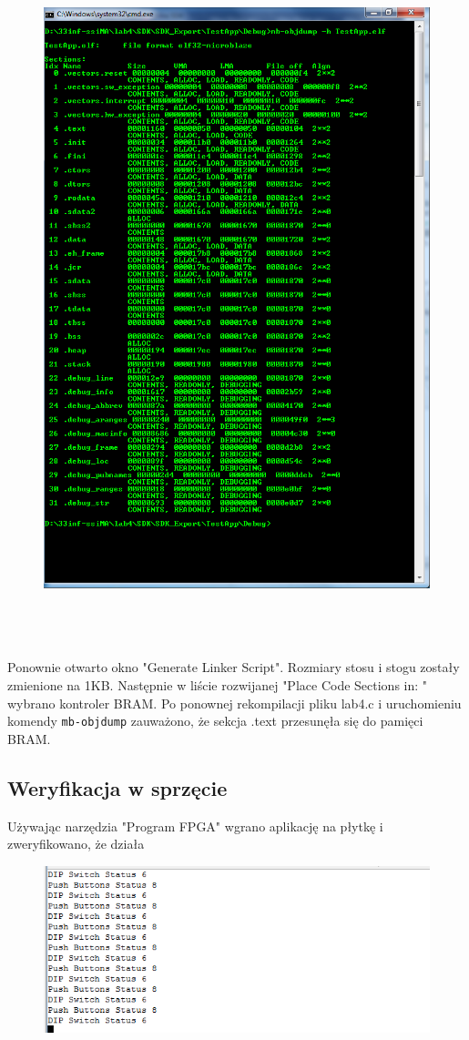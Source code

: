 \begin{figure}[h]
	\centering
	\includegraphics[height=20cm]{img/objdump.PNG}
	\label{img:objdump}
\end{figure}

Ponownie otwarto okno "Generate Linker Script". Rozmiary stosu i stogu zostały zmienione na 1KB. Następnie w liście rozwijanej "Place Code Sections in: " wybrano kontroler BRAM.
\newpage
Po ponownej rekompilacji pliku lab4.c i uruchomieniu komendy \verb+mb-objdump+ zauważono, że sekcja .text przesunęła się do pamięci BRAM.

\subsection{Weryfikacja w sprzęcie}
Używając narzędzia "Program FPGA" wgrano aplikację na płytkę i zweryfikowano, że działa

\begin{figure}[h]
	\centering
	\includegraphics{img/putty-dziala.PNG}
	\label{img:putty-dziala}
\end{figure}
